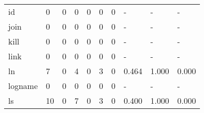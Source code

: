 \begin{longtable}{lp{1.3cm}p{1.3cm}p{1.3cm}p{1.3cm}p{1.3cm}p{1.3cm}p{1.3cm}p{1.3cm}p{1.3cm}}
id        &                      0 &                                  0 &                                 0 &                                0 &                                 0 &                               0 &                                    - &                                      - &                                    - \\
join      &                      0 &                                  0 &                                 0 &                                0 &                                 0 &                               0 &                                    - &                                      - &                                    - \\
kill      &                      0 &                                  0 &                                 0 &                                0 &                                 0 &                               0 &                                    - &                                      - &                                    - \\
link      &                      0 &                                  0 &                                 0 &                                0 &                                 0 &                               0 &                                    - &                                      - &                                    - \\
ln        &                      7 &                                  0 &                                 4 &                                0 &                                 3 &                               0 &                                0.464 &                                  1.000 &                                0.000 \\
logname   &                      0 &                                  0 &                                 0 &                                0 &                                 0 &                               0 &                                    - &                                      - &                                    - \\
ls        &                     10 &                                  0 &                                 7 &                                0 &                                 3 &                               0 &                                0.400 &                                  1.000 &                                0.000 \\

\end{longtable}
